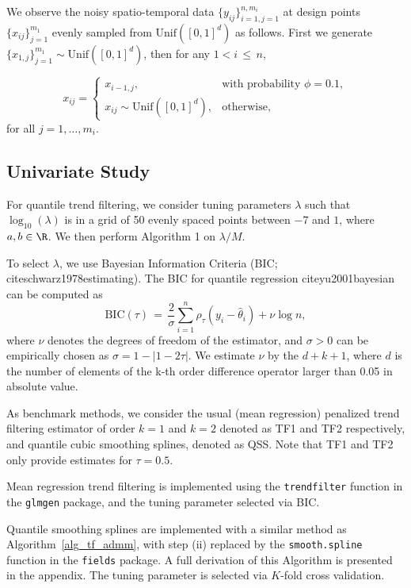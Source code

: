 \documentclass[twoside,11pt]{article}
\newcommand{\rev}[1]{{\color{revisionred}#1}}
\begin{document}
\rev{We observe the noisy spatio-temporal data} \(\{y_{ij}\}_{i=1,j=1}^{n,m_i}\) at design points \(\{x_{ij}\}_{j=1}^{m_1}\) evenly sampled from \(\text{Unif}([0,1]^d)\) as follows. First we generate \(\{x_{1,j}\}_{j=1}^{m_1} \sim \text{Unif}([0,1]^d)\), then for any \(1 < i \,\leq\, n\),

\begin{equation}\label{eq:st_xij}
x_{ij} = 
\begin{cases}
x_{i-1,j}, & \text{with probability } \phi = 0.1,\\
x_{ij} \sim \text{Unif}([0,1]^d), & \text{otherwise},
\end{cases}
\end{equation}
for all \(j = 1, \ldots, m_i\).





\subsection{Univariate Study}

For quantile trend filtering, we consider tuning parameters $\lambda$ such that $\log_{10}(\lambda)$ is in a grid of 50 evenly spaced points between $-7$ and $1$, where $a, b\in \R$. We then perform Algorithm 1 on $\lambda/M$. 

\rev{To select $\lambda$, we use} Bayesian Information Criteria (BIC; cite{schwarz1978estimating}). The BIC for quantile regression cite{yu2001bayesian} can be computed as
\[
\text{BIC}(\tau) \,=\, \frac{2}{\sigma} \sum_{i=1}^{n} \rho_{\tau}(y_{i} - \hat{\theta}_{i}) + \nu \log n,
\]
where $\nu$ denotes the degrees of freedom of the estimator, and $\sigma > 0$ can be empirically chosen as $\sigma = 1 - |1 - 2\tau|$. We estimate $\nu$ by the $d + k + 1$, where $d$ is the number of elements of the k-th order difference operator larger than 0.05 in absolute value.  

As benchmark methods, we consider the usual (mean regression) penalized trend filtering estimator of order $k = 1$ and $k = 2$ denoted as TF1 and TF2 respectively, and quantile cubic smoothing splines, denoted as QSS. Note that TF1 and TF2 only provide estimates for $\tau = 0.5$. 

Mean regression trend filtering is implemented using the \texttt{trendfilter} function in the \texttt{glmgen} package, and the tuning parameter selected via BIC. 

\rev{Quantile smoothing splines are implemented} with a similar method as Algorithm~\ref{alg_tf_admm}, with step (ii) replaced by the \texttt{smooth.spline} function in the \texttt{fields} package. A full derivation of this Algorithm is presented in the appendix. The tuning parameter is selected via $K$-fold cross validation. 
\end{document}
